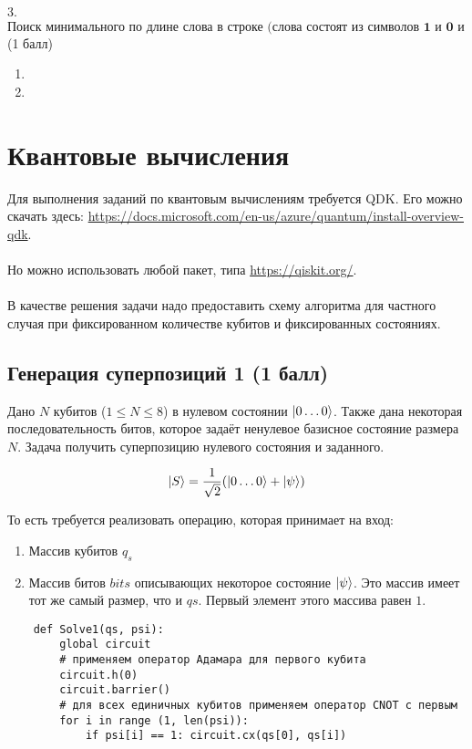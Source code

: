 \documentclass{article}
\begin{document}
\\\\3. $\textbf{Поиск минимального по длине слова в строке (слова состоят из символов 1 и 0 и разделены пробелом)}$ (1 балл)
\begin{enumerate}
    \item 
    \item 
\end{enumerate}




\section{Квантовые вычисления}

Для выполнения заданий по квантовым вычислениям требуется QDK. Его можно скачать здесь: \url{https://docs.microsoft.com/en-us/azure/quantum/install-overview-qdk}. 
\\\\
Но можно использовать любой пакет, типа \url{https://qiskit.org/}. 
\\\\
В качестве решения задачи надо предоставить схему алгоритма для частного случая при фиксированном количестве кубитов и фиксированных состояниях. 


\subsection{Генерация суперпозиций 1 (1 балл)}

Дано $N$ кубитов ($1 \le N \le 8$) в нулевом состоянии $\Ket{0\dots0}$. Также дана некоторая последовательность битов, которое задаёт ненулевое базисное состояние размера $N$. Задача получить суперпозицию нулевого состояния и заданного.

$$\Ket{S} = \frac{1}{\sqrt2}(\Ket{0\dots0} +\Ket{\psi})$$

То есть требуется реализовать операцию, которая принимает на вход:

\begin{enumerate}
    \item Массив кубитов $q_s$
    \item Массив битов $bits$ описывающих некоторое состояние $\Ket{\psi}$. Это массив имеет тот же самый размер, что и $qs$. Первый элемент этого массива равен $1$.
\end{enumerate}


\begin{verbatim}
    def Solve1(qs, psi):
        global circuit
        # применяем оператор Адамара для первого кубита
        circuit.h(0) 
        circuit.barrier()
        # для всех единичных кубитов применяем оператор CNOT с первым
        for i in range (1, len(psi)):
            if psi[i] == 1: circuit.cx(qs[0], qs[i])
\end{verbatim}
\end{document}
